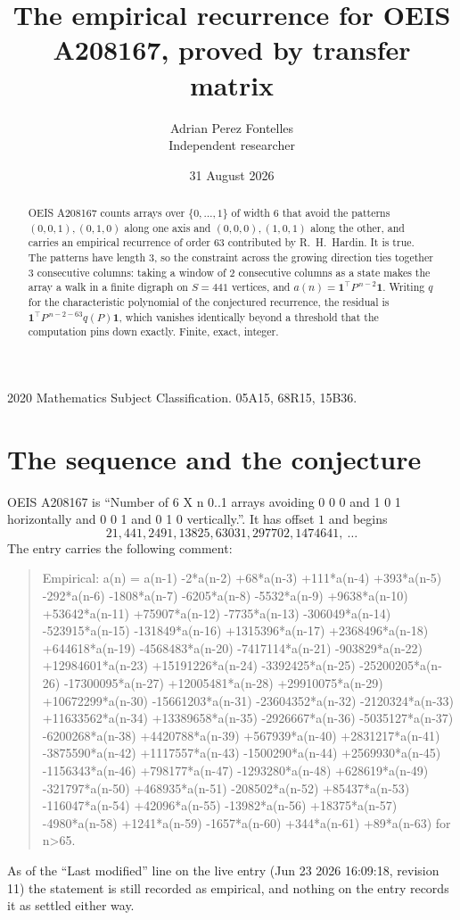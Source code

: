 \documentclass[11pt,a4paper]{article}
\title{The empirical recurrence for OEIS A208167, proved by transfer matrix}
\author{Adrian Perez Fontelles\\ \small Independent researcher}
\date{31 August 2026}
\theoremstyle{plain}
\theoremstyle{definition}
\begin{document}
\maketitle

\begin{abstract}
OEIS A208167 counts arrays over $\{0,\dots,1\}$ of width $6$ that avoid the patterns
$(0,0,1), (0,1,0)$ along one axis and $(0,0,0), (1,0,1)$ along the other, and carries an empirical recurrence of
order $63$ contributed by R.~H.~Hardin. It is true. The patterns have length $3$, so
the constraint across the growing direction ties together $3$ consecutive columns: taking a
window of $2$ consecutive columns as a state makes the array a walk in a finite digraph
on $S=441$ vertices, and $a(n)=\mathbf{1}^{\!\top}P^{\,n-2}\mathbf{1}$. Writing $q$
for the characteristic polynomial of the conjectured recurrence, the residual is
$\mathbf{1}^{\!\top}P^{\,n-2-63}q(P)\mathbf{1}$, which vanishes identically
beyond a threshold that the computation pins down exactly. Finite, exact, integer.
\end{abstract}

\noindent\small 2020 Mathematics Subject Classification. 05A15, 68R15, 15B36.\normalsize

\section{The sequence and the conjecture}

OEIS A208167 is ``Number of 6 X n 0..1 arrays avoiding 0 0 0 and 1 0 1 horizontally and 0 0 1 and 0 1 0 vertically.''. It has offset
$1$ and begins
\[
21, 441, 2491, 13825, 63031, 297702, 1474641,\ \dots
\]
The entry carries the following comment:
\begin{quote}\small
Empirical: a(n) = a(n-1) -2*a(n-2) +68*a(n-3) +111*a(n-4) +393*a(n-5) -292*a(n-6) -1808*a(n-7) -6205*a(n-8) -5532*a(n-9) +9638*a(n-10) +53642*a(n-11) +75907*a(n-12) -7735*a(n-13) -306049*a(n-14) -523915*a(n-15) -131849*a(n-16) +1315396*a(n-17) +2368496*a(n-18) +644618*a(n-19) -4568483*a(n-20) -7417114*a(n-21) -903829*a(n-22) +12984601*a(n-23) +15191226*a(n-24) -3392425*a(n-25) -25200205*a(n-26) -17300095*a(n-27) +12005481*a(n-28) +29910075*a(n-29) +10672299*a(n-30) -15661203*a(n-31) -23604352*a(n-32) -2120324*a(n-33) +11633562*a(n-34) +13389658*a(n-35) -2926667*a(n-36) -5035127*a(n-37) -6200268*a(n-38) +4420788*a(n-39) +567939*a(n-40) +2831217*a(n-41) -3875590*a(n-42) +1117557*a(n-43) -1500290*a(n-44) +2569930*a(n-45) -1156343*a(n-46) +798177*a(n-47) -1293280*a(n-48) +628619*a(n-49) -321797*a(n-50) +468935*a(n-51) -208502*a(n-52) +85437*a(n-53) -116047*a(n-54) +42096*a(n-55) -13982*a(n-56) +18375*a(n-57) -4980*a(n-58) +1241*a(n-59) -1657*a(n-60) +344*a(n-61) +89*a(n-63) for n>65.
\end{quote}
As of the ``Last modified'' line on the live entry (Jun 23 2026 16:09:18, revision
11) the statement is still recorded as empirical, and nothing on the entry
records it as settled either way.
\end{document}
